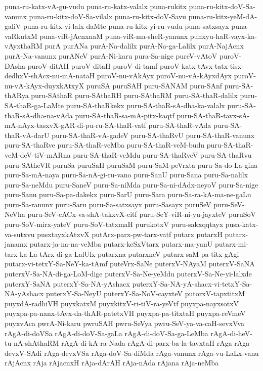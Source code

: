 {puna-ru-katx-vA-gu-vudu
puna-ru-katx-valalx
puna-rukitx
puna-ru-kitx-doV-Sa-vanunx
puna-ru-kitx-doV-Sa-vilalx
puna-ru-kitx-doV-Savu
puna-ru-kitx-yeM-dA-galiV
puna-ru-kitx-yi-lalx-daMte
puna-ru-kitx-yi-ru-vudu
puna-satxsayx
puna-vaRkutxM
puna-viR-jAcnxnaM
puna-viR-ma-sheR-yanunx
punxyu-haR-vayx-ka-vAyxthaRM
purA
purANa
purA-Na-dalilx
purA-Na-ga-Lalilx
purA-NajAcnx
purA-Na-vanunx
purANeV
purA-Ni-karu
pura-Sa-nige
pureV-vAtoV
puroV-DAsha
puroV-ditAH
puroV-ditaH
puroV-di-tamf
puroV-katx-tAvx-tatx-tisx-dedhxV-shAcx-nu-mA-nataH
puroV-nu-vAkAyx
puroV-nu-vA-kAyxdAyx
puroV-nu-vA-kAyx-duyxkAtxyX
puruSA
puruSAH
puru-SANAM
puru-SAnf
puru-SA-thARya
puru-SAthaR
puru-SAthaRH
puru-SAthaRM
puru-SA-thaR-dalilx
puru-SA-thaR-ga-LaMte
puru-SA-thaRkekx
puru-SA-thaR-sA-dha-ka-valalx
puru-SA-thaR-sA-dha-na-vAda
puru-SA-thaR-sa-mA-pitx-kaqtf
puru-SA-thaR-tavx-sA-mA-nAyx-tasxvX-gAR-di-pu-ru-SA-thaR-vatf
puru-SA-thaR-vAda
puru-SA-thaR-vA-darU
puru-SA-thaR-vA-gadeV
puru-SA-thaRvU
puru-SA-thaR-vanunx
puru-SA-thaRve
puru-SA-thaR-veMba
puru-SA-thaR-veM-budu
puru-SA-thaR-veM-deV-tiV-mARna
puru-SA-thaR-veMdu
puru-SA-thaRveV
puru-SA-thaRvu
puru-SAtheVR
puruSa
puruSaH
puruSaM
puru-SaM-peVrxta
puru-Sa-do-La-gina
puru-Sa-mA-naya
puru-Sa-nA-gi-ru-vano
puru-SanU
puru-Sana
puru-Sa-nalilx
puru-Sa-neMdu
puru-SaneV
puru-Sa-niMda
puru-Sa-ni-dAdx-neyoV
puru-Sa-nige
puru-Sanu
puru-Sa-pa-dakekx
puru-SarU
puru-Sara
puru-Sa-ra-kA-ma-ne-gaLu
puru-Sa-ranunx
puru-Saru
puru-Sa-satxsayx
puru-Sasayx
puruSeV
puru-SeV-NeVha
puru-SeV-cACx-va-shA-takxvX-citf
puru-SeY-viR-ni-yu-jayxteV
puruSoV
puru-SoV-mirx-yateV
puru-SoV-tatxmaH
purukotxV
puru-sakxqqtayx
pusa-katx-va-sutxvu
pusxtayxkAtxvX
putArx-parx-pw-tarx-vatf
putarx
putarxH
putarx-janamx
putarx-ja-na-na-veMba
putarx-keSxVtarx
putarx-ma-yanU
putarx-mi-tarx-ka-La-tArx-di-ga-LalUlx
putarxna
putarxneV
putarx-saM-pa-titx-gAgi
putarx-vi-tetxY-Sa-NeY-ka-tAmf
puteVrx-SaNe
puterxV-NAyaM
puterxV-SaNA
puterxV-Sa-NA-di-ga-LoM-dige
puterxV-Sa-Ne-yeMdu
puterxV-Sa-Ne-yi-lalxde
puterxY-SaNA
puterxY-Sa-NA-yAshacx
puterxY-Sa-NA-yA-shacx-vi-tetxY-Sa-NA-yAshacx
puterxY-Sa-NeyU
puterxY-Sa-NoV-cayxteV
putorxV-tapxtitxM
puyxdA-radhiVH
puyxkatxM
puyxkitxV-ri-tiV-ra-yeVtf
puyxpa-nayxsotxV
puyxpa-pa-nanx-tAvx-da-thAR-patetxVH
puyxpa-pa-titxtaH
puyxpa-reVmeV
puyxvAca
pwrA-Ni-karu
pwruSAH
pwru-SeVya
pwru-SeV-ya-va-caH-sevxVva
rAgA-di-doVSa
rAgA-di-doV-Sa-gaLa
rAgA-di-doV-Sa-ga-LeMba
rAgA-di-heV-tu-nA-shAthaRM
rAgA-di-kA-ra-Nada
rAgA-di-parx-ba-la-tavxtaH
rAga
rAga-devxV-SAdi
rAga-devxVSa
rAga-doV-Sa-diMda
rAga-vanunx
rAga-vu-LaLx-vanu
rAjAcnx
rAja
rAjacnxH
rAja-dArAH
rAja-nAda
rAjana
rAja-neMba
}
